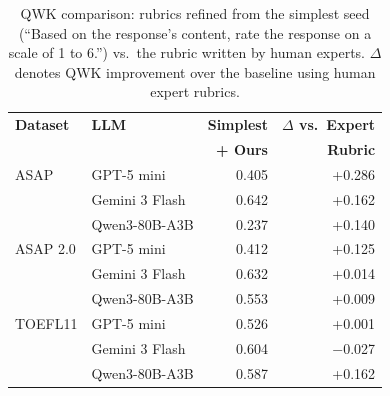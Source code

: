 \begin{table}[t]
\centering
\small
\caption{QWK comparison: rubrics refined from the simplest seed (``Based on the response's content, rate the response on a scale of 1 to 6.'') vs.\ the rubric written by human experts. $\Delta$ denotes QWK improvement over the baseline using human expert rubrics.}
\label{tab:simplest}
\begin{tabular}{llrr}
\toprule
\textbf{Dataset} & \textbf{LLM} & \textbf{Simplest} & \textbf{$\Delta$ vs.\ Expert} \\
 & & \textbf{+ Ours} & \textbf{Rubric} \\
\midrule
ASAP & GPT-5 mini & 0.405 & +0.286 \\
 & Gemini 3 Flash & 0.642 & +0.162 \\
 & Qwen3-80B-A3B & 0.237 & +0.140 \\
\midrule
ASAP 2.0 & GPT-5 mini & 0.412 & +0.125 \\
 & Gemini 3 Flash & 0.632 & +0.014 \\
 & Qwen3-80B-A3B & 0.553 & +0.009 \\
\midrule
TOEFL11 & GPT-5 mini & 0.526 & +0.001 \\
 & Gemini 3 Flash & 0.604 & $-$0.027 \\
 & Qwen3-80B-A3B & 0.587 & +0.162 \\
\bottomrule
\end{tabular}
\end{table}
